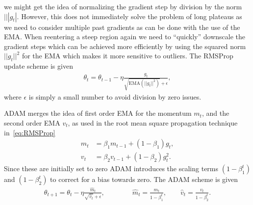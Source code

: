 we might get the idea of normalizing the gradient step by division by the norm $|||g_t|$. However, this does not immediately solve the problem of long plateaus as we need to consider multiple past gradients as can be done with the use of the \acrshort{EMA}. When reentering a steep region again we need to ``quickly'' downscale the gradient steps which can be achieved more efficiently by using the squared norm $||g_t||^2$ for the \acrshort{EMA} which makes it more sensitive to outliers. The \acrshort{RMSProp} update scheme is given
\begin{align}
  \theta_t = \theta_{t-1} - \eta \frac{g_t}{\sqrt{\text{EMA}(||g_t||^2)}+ \epsilon},
  \label{eq:RMSProp}
\end{align}
where $\epsilon$ is simply a small number to avoid division by zero issues. 

ADAM merges the idea of first order \acrshort{EMA} for the momentum $m_t$, and the second order \acrshort{EMA} $v_t$, as used in the root mean square propagation technique in~\cref{eq:RMSProp}
\begin{align*}
  m_t &= \beta_1 m_{t-1} + (1-\beta_1)g_t, \\
  v_t &= \beta_2 v_{t-1} + (1-\beta_2)g_t^2. 
\end{align*}
Since these are initially set to zero ADAM introduces the scaling terms  $(1-\beta^t_1)$ and $(1-\beta^t_2)$ to correct for a bias towards zero. The ADAM scheme is given~\cite{kingma2017adam}
\begin{align}
  \theta_{t+1} = \theta_t - \eta \frac{\hat{m}_t}{\sqrt{\hat{v}_t} + \epsilon}, \qquad \qquad \hat{m}_t = \frac{m_t}{1-\beta^t_1}, \qquad \hat{v}_t = \frac{v_t}{1-\beta^t_2}.
  \label{eq:ADAM}
\end{align}


